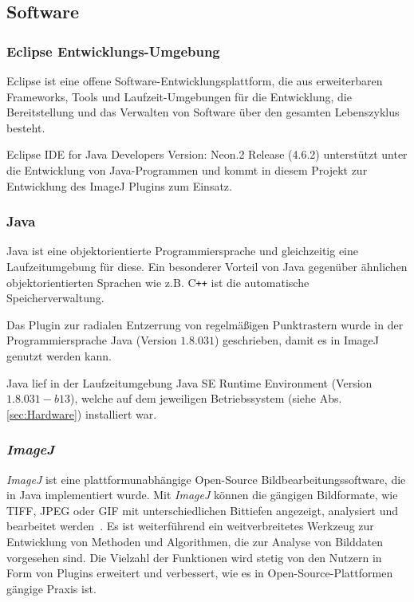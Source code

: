 \subsection{Software}\label{sec:Software}

\subsubsection{Eclipse Entwicklungs-Umgebung}
Eclipse ist eine offene Software-Entwicklungsplattform, die aus erweiterbaren Frameworks, Tools und Laufzeit-Umgebungen für die Entwicklung, die Bereitstellung und das Verwalten von Software über den gesamten Lebenszyklus besteht.
\cite{eclipse}

Eclipse IDE for Java Developers Version: Neon.2 Release (4.6.2)
unterstützt unter die Entwicklung von Java-Programmen und kommt in diesem Projekt zur Entwicklung des ImageJ Plugins zum Einsatz.


\subsubsection{Java}
Java ist eine objektorientierte Programmiersprache und gleichzeitig eine Laufzeitumgebung für diese. Ein besonderer Vorteil von Java gegenüber ähnlichen objektorientierten Sprachen wie z.B. C\texttt{++} ist die automatische Speicherverwaltung. \cite{java}

Das Plugin zur radialen Entzerrung von regelmäßigen Punktrastern wurde in der Programmiersprache Java (Version $ 1.8.0 31 $) geschrieben, damit es in ImageJ genutzt werden kann.

Java lief in der Laufzeitumgebung Java SE Runtime Environment (Version $ 1.8.0 31-b13 $), welche auf dem jeweiligen Betriebssystem (siehe Abs. \ref{sec:Hardware}) installiert war.

\subsubsection{\textit{ImageJ}}
\textit{ImageJ} ist eine plattformunabhängige Open-Source Bildbearbeitungssoftware, die in Java implementiert wurde. Mit \textit{ImageJ} können die gängigen Bildformate, wie TIFF, JPEG oder GIF mit unterschiedlichen Bittiefen angezeigt, analysiert und bearbeitet werden~\cite{Collins_ImageJ}. Es ist weiterführend ein weitverbreitetes Werkzeug zur Entwicklung von Methoden und Algorithmen, die zur Analyse von Bilddaten vorgesehen sind. Die Vielzahl der Funktionen wird stetig von den Nutzern in Form von Plugins erweitert und verbessert, wie es in Open-Source-Plattformen gängige Praxis ist.

